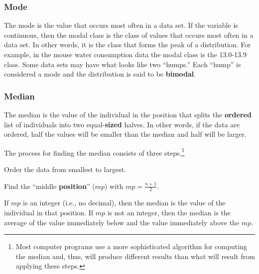 \documentclass[10pt,openany]{book}\usepackage[]{graphicx}\usepackage[]{color}
\begin{document}

\vspace{-12pt}

\subsubsection{Mode}
The mode is the value that occurs most often in a data set.  If the variable is continuous, then the modal class is the class of values that occurs most often in a data set.  In other words, it is the class that forms the peak of a distribution.  For example, in the mouse water consumption data  the modal class is the 13.0-13.9 class.  Some data sets may have what looks like two ``humps.''  Each ``hump'' is considered a mode and the distribution is said to be \textbf{bimodal}.


\vspace{-12pt}

\subsubsection{Median} \label{sec:Median}
The median is the value of the individual in the position that splits the \textbf{ordered} list of individuals into two equal-\textbf{sized} halves.  In other words, if the data are ordered, half the values will be smaller than the median and half will be larger.

The process for finding the median consists of three steps,\footnote{Most computer programs use a more sophisticated algorithm for computing the median and, thus, will produce different results than what will result from applying these steps.}
\begin{Enumerate}
  \item Order the data from smallest to largest.
  \item Find the ``middle \textbf{position}'' ($mp$) with $mp=\frac{n+1}{2}$.
  \item If $mp$ is an integer (i.e., no decimal), then the median is the value of the individual in that position.  If $mp$ is not an integer, then the median is the average of the value immediately below and the value immediately above the $mp$.
\end{Enumerate}
\end{document}
